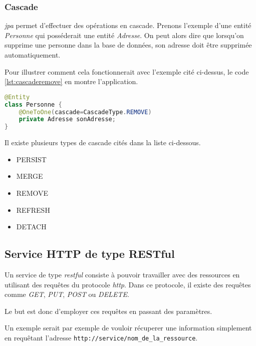 \subsubsection{Cascade}
\emph{\gls{jpa}} permet d'effectuer des opérations en cascade. Prenons l'exemple d'une entité \emph{Personne} qui posséderait une entité \emph{Adresse}. On peut alors dire que lorsqu'on supprime une personne dans la base de données, son adresse doit être supprimée automatiquement.

\medskip

Pour illustrer comment cela fonctionnerait avec l'exemple cité ci-dessus, le code \ref{lst:cascaderemove} en montre l'application.

\begin{lstlisting}[language={JAVA}, caption={JPA - Suppression en cascade}, label={lst:cascaderemove}]
@Entity
class Personne {
    @OneToOne(cascade=CascadeType.REMOVE)
    private Adresse sonAdresse;
}
\end{lstlisting}

Il existe plusieurs types de cascade cités dans la liste ci-dessous.

\medskip

\begin{itemize}
  \item PERSIST
  \item MERGE
  \item REMOVE
  \item REFRESH
  \item DETACH
\end{itemize}

\subsection{Service HTTP de type RESTful} %
\label{sub:service_de_type_restful}

Un service de type \emph{\gls{rest}ful} consiste à pouvoir travailler avec des ressources en utilisant des requêtes du protocole \emph{\gls{http}}. Dans ce protocole, il existe des requêtes comme \emph{GET}, \emph{PUT}, \emph{POST} ou \emph{DELETE}.

\medskip

Le but est donc d'employer ces requêtes en passant des paramètres.

\medskip

Un exemple serait par exemple de vouloir récuperer une information simplement en requêtant l'adresse \texttt{http://service/nom\_de\_la\_ressource}.

